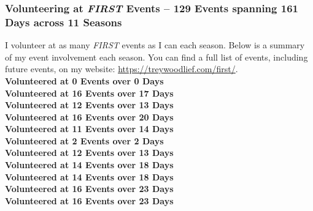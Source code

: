 \subsubsection*{Volunteering at \textit{FIRST} Events -- 129 Events spanning 161 Days across 11 Seasons}
I volunteer at as many \textit{FIRST} events as I can each season. Below is a summary of my event involvement each season.
You can find a full list of events, including future events, on my website: \url{https://treywoodlief.com/first/}.\\ 
 \textbf{Volunteered at 0 Events over 0 Days}\\ 
 \textbf{Volunteered at 16 Events over 17 Days}\\ 
 \textbf{Volunteered at 12 Events over 13 Days}\\ 
 \textbf{Volunteered at 16 Events over 20 Days}\\ 
 \textbf{Volunteered at 11 Events over 14 Days}\\ 
 \textbf{Volunteered at 2 Events over 2 Days}\\ 
 \textbf{Volunteered at 12 Events over 13 Days}\\ 
 \textbf{Volunteered at 14 Events over 18 Days}\\ 
 \textbf{Volunteered at 14 Events over 18 Days}\\ 
 \textbf{Volunteered at 16 Events over 23 Days}\\ 
 \textbf{Volunteered at 16 Events over 23 Days}\\ 
